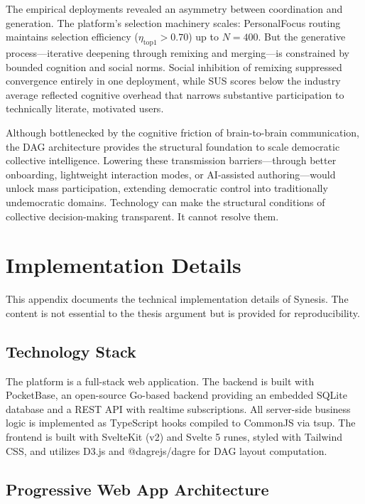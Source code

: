 \documentclass[a4paper, 12pt, twoside]{iviathesis}
\begin{document}
The empirical deployments revealed an asymmetry between coordination and generation. The platform's selection machinery scales: PersonalFocus routing maintains selection efficiency ($\eta_{\text{top1}} > 0.70$) up to $N = 400$. But the generative process---iterative deepening through remixing and merging---is constrained by bounded cognition and social norms. Social inhibition of remixing suppressed convergence entirely in one deployment, while SUS scores below the industry average reflected cognitive overhead that narrows substantive participation to technically literate, motivated users.

Although bottlenecked by the cognitive friction of brain-to-brain communication, the DAG architecture provides the structural foundation to scale democratic collective intelligence. Lowering these transmission barriers---through better onboarding, lightweight interaction modes, or AI-assisted authoring---would unlock mass participation, extending democratic control into traditionally undemocratic domains. Technology can make the structural conditions of collective decision-making transparent. It cannot resolve them.

\appendix
\chapter{Implementation Details}
\label{ch:appendix}

This appendix documents the technical implementation details of Synesis. The content is not essential to the thesis argument but is provided for reproducibility.

\section{Technology Stack}
The platform is a full-stack web application. The backend is built with PocketBase, an open-source Go-based backend providing an embedded SQLite database and a REST API with realtime subscriptions. All server-side business logic is implemented as TypeScript hooks compiled to CommonJS via tsup. The frontend is built with SvelteKit (v2) and Svelte 5 runes, styled with Tailwind CSS, and utilizes D3.js and @dagrejs/dagre for DAG layout computation.

\section{Progressive Web App Architecture}
\label{sec:appendix-pwa}
\end{document}
